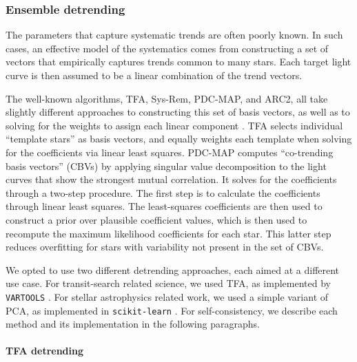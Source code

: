 \documentclass[12pt,twocolumn,tighten]{aastex62}
\begin{document}
\subsubsection{Ensemble detrending}
\label{subsubsec:ensemble}

The parameters that capture systematic trends are often poorly known.
In such cases, an effective model of the systematics comes from
constructing a set of vectors that empirically captures trends common
to many stars.  Each target light curve is then assumed to be a linear
combination of the trend vectors.

The well-known algorithms, TFA, Sys-Rem, PDC-MAP, and ARC2, all take
slightly different approaches to constructing this set of basis
vectors, as well as to solving for the weights to assign each linear
component
\citep{kovacs_trend_2005,tamuz_correcting_2005,smith_pdc_2012,aigrain_robust_2017}.
TFA selects individual ``template stars'' as basis vectors, and
equally weights each template when solving for the coefficients via
linear least squares.  PDC-MAP computes ``co-trending basis vectors''
(CBVs) by applying singular value decomposition to the light curves
that show the strongest mutual correlation.  It solves for the
coefficients through a two-step procedure.  The first step is to
calculate the coefficients through linear least squares.  The
least-squares coefficients are then used to construct a prior over
plausible coefficient values, which is then used to recompute the
maximum likelihood coefficients for each star.  This latter step
reduces overfitting for stars with variability not present in the set
of CBVs.

We opted to use two different detrending approaches, each aimed
at a different use case.  For transit-search related science,
we used TFA, as implemented by \texttt{VARTOOLS}
\citep{kovacs_trend_2005,Hartman_Bakos_2016}.  For stellar
astrophysics related work, we used a simple variant of PCA, as
implemented in \texttt{scikit-learn} \citep{sklearn_2011}.  For
self-consistency, we describe each method and its implementation in
the following paragraphs.

\paragraph{TFA detrending}
\end{document}
